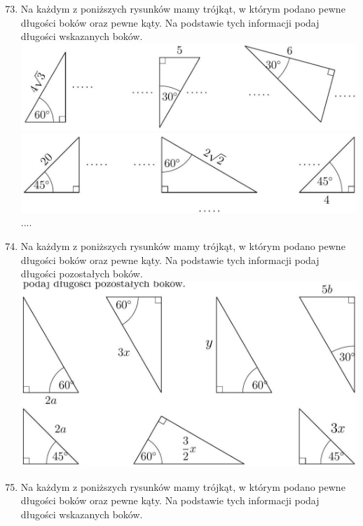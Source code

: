 \documentclass[10pt]{article}
\begin{document}
\begin{enumerate}
  \setcounter{enumi}{72}
  \item Na każdym z poniższych rysunków mamy trójkąt, w którym podano pewne długości boków oraz pewne kąty. Na podstawie tych informacji podaj długości wskazanych boków.\\
\includegraphics[max width=\textwidth, center]{2024_11_21_71f62bd117d375398909g-134(1)}\\
\includegraphics[max width=\textwidth, center]{2024_11_21_71f62bd117d375398909g-135}\\
....
  \item Na każdym z poniższych rysunków mamy trójkąt, w którym podano pewne długości boków oraz pewne kąty. Na podstawie tych informacji podaj długości pozostałych boków.\\
\includegraphics[max width=\textwidth, center]{2024_11_21_71f62bd117d375398909g-135(2)}
  \item Na każdym z poniższych rysunków mamy trójkąt, w którym podano pewne długości boków oraz pewne kąty. Na podstawie tych informacji podaj długości wskazanych boków.\\

\end{enumerate}
\end{document}
